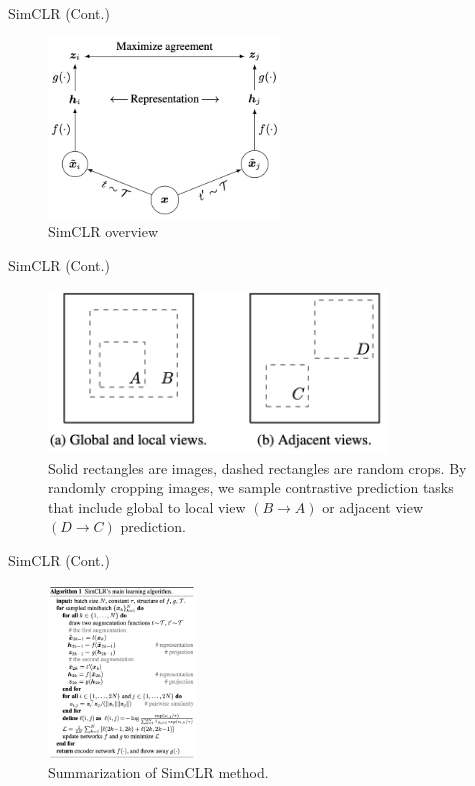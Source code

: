 \documentclass[serif, aspectratio=169]{beamer}
\begin{document}
\begin{frame}{SimCLR (Cont.)}
    \begin{figure}
        \setlength{\abovecaptionskip}{0pt}
        \setlength{\belowcaptionskip}{1pt}
        \centering
        \includegraphics[width=0.55\textwidth]{pic/simclr/3.png}
        \caption{SimCLR overview}
   \end{figure}
\end{frame}


\begin{frame}{SimCLR (Cont.)}
    \begin{figure}
        \setlength{\abovecaptionskip}{0pt}
        \setlength{\belowcaptionskip}{1pt}
        \centering
        \includegraphics[width=0.8\textwidth]{pic/simclr/4.png}
        \caption{Solid rectangles are images, dashed rectangles are random crops. By randomly cropping images, we sample contrastive prediction tasks that include global to local view $\left(B \xrightarrow{} A\right)$ or adjacent view $\left(D \xrightarrow{} C\right)$ prediction.}
   \end{figure}
\end{frame}


\begin{frame}{SimCLR (Cont.)}
    \begin{figure}
        \setlength{\abovecaptionskip}{0pt}
        \setlength{\belowcaptionskip}{1pt}
        \centering
        \includegraphics[width=0.35\textwidth]{pic/simclr/5.png}
        \caption{Summarization of SimCLR method.}
   \end{figure}
\end{frame}
\end{document}
